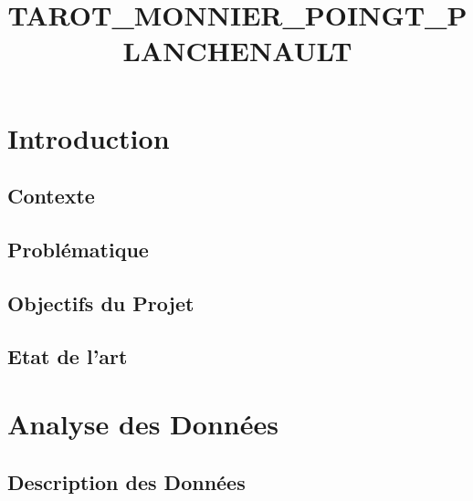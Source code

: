 \documentclass{rapport}
\title{TAROT_MONNIER_POINGT_PLANCHENAULT} %
\begin{document}




        
\fairemarges %
\fairepagedegarde %
\tabledematieres %



\section{Introduction} 
\subsection{Contexte}

\cite{koBriefReviewFacial2018}
\cite{sariyanidiAutomaticAnalysisFacial2015}

\subsection{Problématique}

\subsection{Objectifs du Projet}

\subsection{Etat de l'art}

\section{Analyse des Données}
\subsection{Description des Données}
\end{document}
